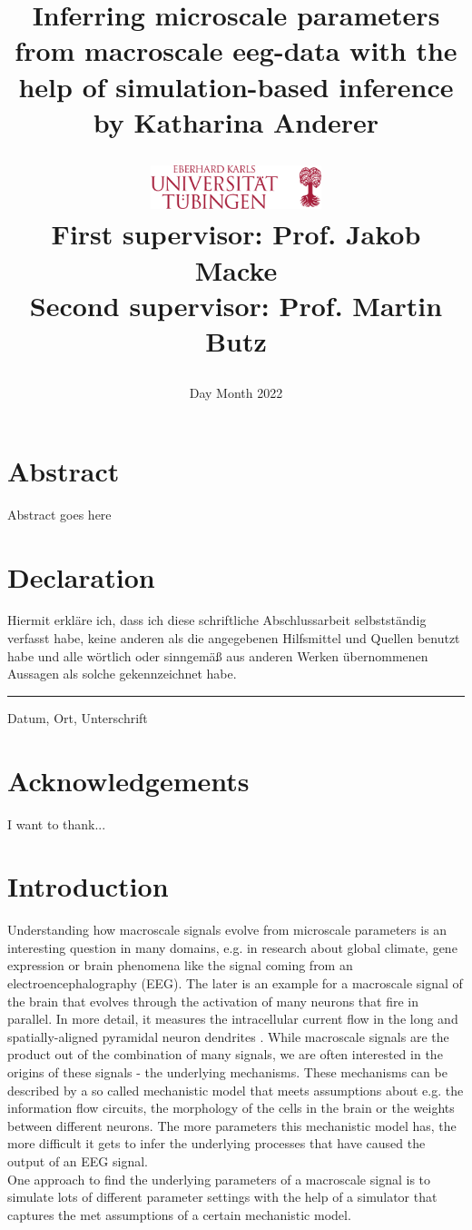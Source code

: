 \documentclass[12pt]{report}
\title{
Inferring microscale parameters from macroscale eeg-data with the help of simulation-based inference\\
\vspace{50px}
{\large by Katharina Anderer}
\vspace{60px}

\hspace{10px}\includegraphics[width=50mm,scale=0.5]{images/UniversitaetTuebingen.png}\\
\vspace{50px}
{\large First supervisor: Prof. Jakob Macke}\\
{\large Second supervisor: Prof. Martin Butz}
}
\author{}
\date{Day Month 2022}
\begin{document}
\maketitle


\chapter*{Abstract}
Abstract goes here


\chapter*{Declaration}
Hiermit erkläre ich, dass ich diese schriftliche Abschlussarbeit selbstständig verfasst habe, keine anderen als die angegebenen Hilfsmittel und Quellen benutzt habe und alle wörtlich oder sinngemäß aus anderen Werken übernommenen Aussagen als solche gekennzeichnet habe.\\


\vspace{60px}


\par\noindent\rule{\textwidth}{0.4pt}

Datum, Ort, Unterschrift

\chapter*{Acknowledgements}
I want to thank...

\tableofcontents

\chapter*{Introduction}

Understanding how macroscale signals evolve from microscale parameters
is an interesting question in many domains, e.g.
in research about global
climate, gene expression or brain phenomena like the signal coming from an
electroencephalography (EEG).
The later is an example for a macroscale signal of
the brain that evolves through the activation of many neurons that fire in
parallel. In more detail, it measures the intracellular current flow in the long and
spatially-aligned pyramidal neuron dendrites \citep{neymotin2020human}.
While macroscale signals are the product out of the combination of many signals, we are often interested in the origins of these signals - the underlying mechanisms. 
These mechanisms can be described by a so called mechanistic model that meets assumptions about e.g. the information flow circuits, the morphology of the cells in the brain or the weights between different neurons. The more parameters this mechanistic model has, the more difficult it gets to infer the underlying processes that have caused the output of an EEG signal. \\
One approach to find the underlying parameters of a macroscale signal is to simulate lots of different parameter settings with the help of a simulator that captures the met assumptions of a certain mechanistic model. 
\end{document}
